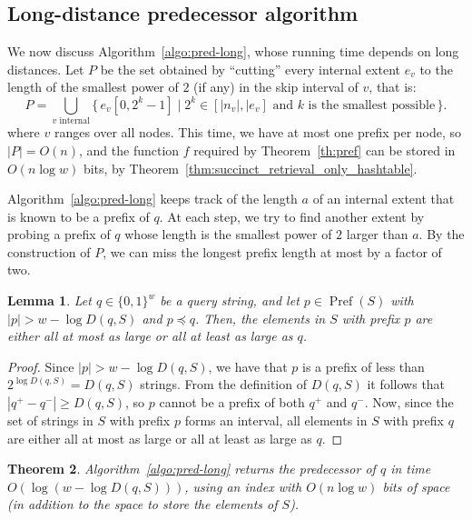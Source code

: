 \documentclass[a4paper,11pt]{article}
\newtheorem{theorem}{Theorem}[section]
\newtheorem{lemma}[theorem]{Lemma}
\newcommand{\?}{\mskip1.5mu}
\DeclareMathOperator{\Pref}{Pref}
\begin{document}
\subsection{Long-distance predecessor algorithm}
\label{sec:long}

We now discuss Algorithm~\ref{algo:pred-long}, whose 
running time depends on long
distances. Let $P$ be the set obtained by ``cutting''
every internal extent $e_v$ to the length of the smallest power of 
$2$ (if any) in the skip interval of $v$, that is:
\[
P =\bigcup_\text{$v$ internal}\{\,e_v[0,2^k -1] \mid 2^k \in
	[|n_v|, |e_v] \text{ and $k$ is the smallest possible}\,\}.
\]
where $v$ ranges over all nodes. This time, we
have at most one prefix per node, so $|P| = O(n)$, and 
the function $f$ required by Theorem~\ref{th:pref} can be stored 
in $O(n\log w)$ bits, by Theorem~\ref{thm:succinct_retrieval_only_hashtable}. 

Algorithm~\ref{algo:pred-long} keeps track of the length $a$ of an
internal extent that is known to be a prefix of $q$. At each step, we 
try to find another extent by probing a prefix of $q$ whose 
length is the smallest power of $2$ larger than
$a$. By the construction of $P$, we can miss the longest
prefix length at most by a factor of two. 

\begin{lemma}
\label{lemma:shortinprefs}
Let $q \in \{0, 1\}^w$ be a query string,
and let $p \in \Pref(S)$ with 
$|p| > w - \log D(q,S)$ and
$p \preceq q$. Then, 
the elements in $S$ with prefix $p$
are either all at most as large or all
at least as large as $q$.
\end{lemma}

\begin{proof}
Since $|p| > w - \log D(q, S)$, we have
that $p$ is a prefix of less than
$2^{\log D(q,S)} = D(q, S)$ strings.
From the definition of $D(q, S)$ it follows
that $|q^+ - q^-| \geq D(q, S)$, so $p$
cannot be a prefix of both $q^+$ and $q^-$.
Now, since the set of strings in $S$ 
with prefix $p$ forms an interval, all elements
in $S$ with prefix $q$ are either all at most as large
or all at least as large as $q$.
\end{proof}


\begin{theorem}	
\label{thm:pred-long}
Algorithm~\ref{algo:pred-long} returns the predecessor of  $q$
in time $O(\log(w-\log D(q, S)))$, using an index with 
$O(n \log w)$ bits of space (in addition to the space 
to store the elements of $S$).
\end{theorem}
\end{document}
